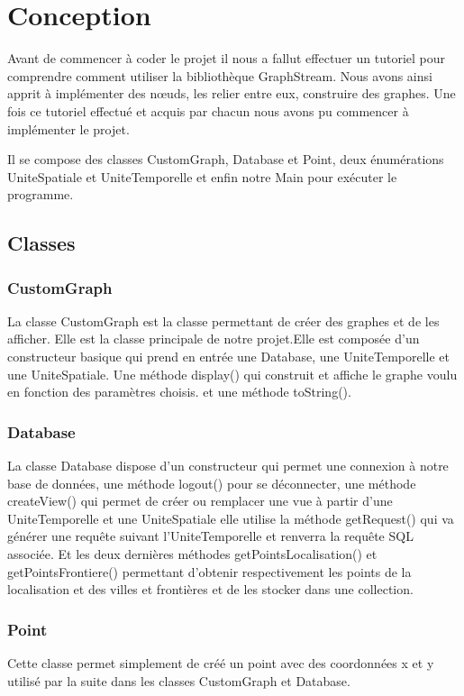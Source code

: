\chapter{Conception}
Avant de commencer à coder le projet il nous a fallut effectuer un tutoriel pour comprendre comment utiliser la bibliothèque GraphStream. Nous avons ainsi apprit à implémenter des nœuds, les relier entre eux, construire des graphes.
Une fois ce tutoriel effectué et acquis par chacun nous avons pu commencer à implémenter le projet. \newline

Il se compose des classes CustomGraph, Database et Point, deux énumérations UniteSpatiale et UniteTemporelle et enfin notre Main pour exécuter le programme.
\section{Classes}
\subsection{CustomGraph}
 La classe CustomGraph est la classe permettant de créer des graphes et de les afficher. Elle est la classe principale de notre projet.Elle est composée d'un constructeur basique qui prend en entrée une Database, une UniteTemporelle et une UniteSpatiale.
 Une méthode display() qui construit et affiche le graphe voulu en fonction des paramètres choisis.
  et une méthode toString().
\subsection{Database}
 La classe Database dispose d'un constructeur qui permet une connexion à notre base de données, une méthode logout() pour se déconnecter, une méthode createView() qui permet de créer ou remplacer une vue à partir d'une UniteTemporelle et une UniteSpatiale elle utilise la méthode getRequest() qui va générer une requête suivant l'UniteTemporelle et renverra la requête SQL associée.
 Et les deux dernières méthodes getPointsLocalisation() et getPointsFrontiere() permettant d'obtenir respectivement les points de la localisation et des villes et frontières et de les stocker dans une collection.
\subsection{Point}
Cette classe permet simplement de créé un point avec des coordonnées x et y utilisé par la suite dans les classes CustomGraph et Database.
